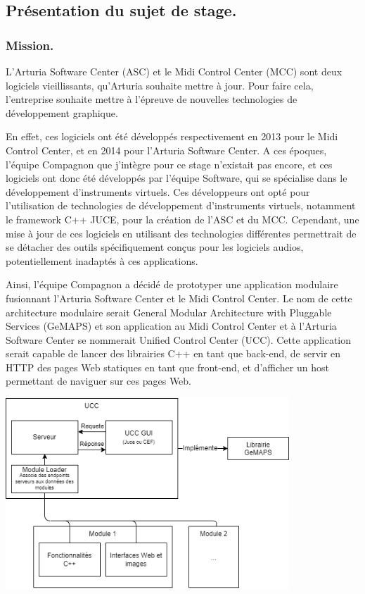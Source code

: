 \documentclass[francais]{rapportPFE}  %
\begin{document}
\subsection{Présentation du sujet de stage.}


\subsubsection{Mission.}

L'Arturia Software Center (ASC) et le Midi Control Center (MCC) sont deux logiciels vieillissants, qu'Arturia souhaite mettre à jour. Pour faire cela, l'entreprise souhaite mettre à l'épreuve de nouvelles technologies de développement graphique.

En effet, ces logiciels ont été développés respectivement en 2013 pour le Midi Control Center, et en 2014 pour l'Arturia Software Center. A ces époques, l'équipe Compagnon que j'intègre pour ce stage n'existait pas encore, et ces logiciels ont donc été développés par l'équipe Software, qui se spécialise dans le développement d'instruments virtuels. Ces développeurs ont opté pour l'utilisation de technologies de développement d'instruments virtuels, notamment le framework C++ JUCE, pour la création de l'ASC et du MCC. Cependant, une mise à jour de ces logiciels en utilisant des technologies différentes permettrait de se détacher des outils spécifiquement conçus pour les logiciels audios, potentiellement inadaptés à ces applications.

Ainsi, l'équipe Compagnon a décidé de prototyper une application modulaire fusionnant l'Arturia Software Center et le Midi Control Center. Le nom de cette architecture modulaire serait General Modular Architecture with Pluggable Services (GeMAPS) et son application au Midi Control Center et à l'Arturia Software Center se nommerait Unified Control Center (UCC). Cette application serait capable de lancer des librairies C++ en tant que back-end, de servir en HTTP des pages Web statiques en tant que front-end, et d'afficher un host permettant de naviguer sur ces pages Web. 


\begin{center}
	\centering
	\includegraphics[width=0.8\textwidth]{graphics/modulaire.png}
	\begin{tiny}
	\end{tiny}
	\label{fig}
\end{center}
\end{document}
